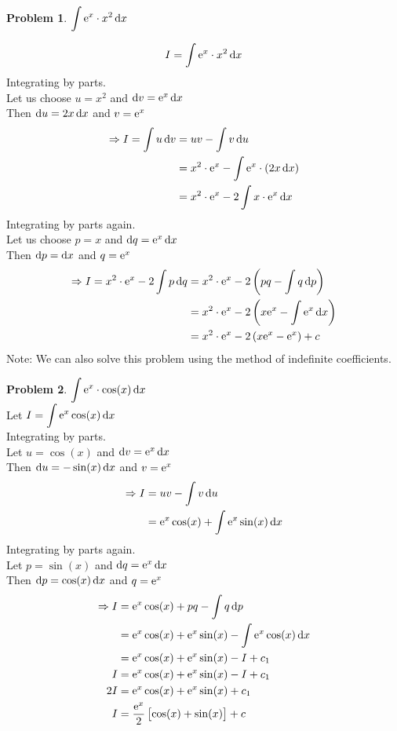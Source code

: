 \documentclass[14]{article}
\theoremstyle{definition}
\newtheorem{prob}{Problem}
\theoremstyle{case}
\begin{document}
\begin{prob}
$\displaystyle \int {\rm e}^x \cdot x^2 \dif x$
\end{prob}
\[I = \int {\rm e}^x \cdot x^2 \dif x\]
Integrating by parts.\\
Let us choose $u = x^2$ and $\dif v = {\rm e}^x \dif x$\\
Then $\dif u = 2x \dif x$ and $v = {\rm e}^x$\\
\begin{align*}
\Rightarrow I = \int u \dif v &= uv - \int v \dif u\\
&= x^2 \cdot {\rm e}^x - \int {\rm e}^x \cdot (2x \dif x)\\
&= x^2 \cdot {\rm e}^x - 2 \int x \cdot {\rm e}^x \dif x
\end{align*}
Integrating by parts again.\\
Let us choose $p = x$ and $\dif q = {\rm e}^x \dif x$\\
Then $\dif p = \dif x$ and $q = {\rm e}^x$
\begin{align*}
\Rightarrow I = x^2 \cdot {\rm e}^x - 2 \int p \dif q &= x^2 \cdot {\rm e}^x - 2 \left( pq - \int q \dif p \right)\\
&= x^2 \cdot {\rm e}^x - 2 \left( x {\rm e}^x - \int {\rm e}^x \dif x \right)\\
&= x^2 \cdot {\rm e}^x - 2 \left( x {\rm e}^x - {\rm e}^x \right) + c
\end{align*}
Note: We can also solve this problem using the method of indefinite coefficients.
\pagebreak
\begin{prob}
$\displaystyle \int {\rm e}^x \cdot \cos(x) \dif x$\\
Let $I = \displaystyle\int{\rm e}^x\cos(x) \dif x$\\
Integrating by parts.\\
Let $u = \cos(x)$ and $\dif v = {\rm e}^x \dif x$\\
Then $\dif u = -\sin(x) \dif x$ and $v = {\rm e}^x$
\begin{align*}
\Rightarrow I &= uv - \int v \dif u\\
&= {\rm e}^x \cos(x) + \int {\rm e}^x \sin(x) \dif x
\end{align*}
Integrating by parts again.\\
Let $p = \sin(x)$ and $\dif q = {\rm e}^x \dif x$\\
Then $\dif p = \cos(x) \dif x$ and $q = {\rm e}^x$
\begin{align*}
\Rightarrow I &= {\rm e}^x \cos(x) + pq - \int q \dif p\\
&= {\rm e}^x \cos(x) + {\rm e}^x \sin(x) - \int {\rm e}^x \cos(x) \dif x\\
&= {\rm e}^x \cos(x) + {\rm e}^x \sin(x) - I + c_1\\
I &= {\rm e}^x \cos(x) + {\rm e}^x \sin(x) - I + c_1 \\
2I &= {\rm e}^x \cos(x) + {\rm e}^x \sin(x) + c_1 \\
I &= \dfrac{{\rm e}^x}2 \left[ \cos(x) + \sin(x) \right] + c
\end{align*}
\end{prob}
\pagebreak
\end{document}
